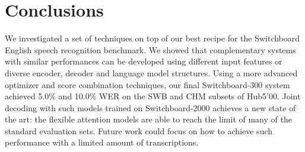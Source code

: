 \documentclass[a4paper]{article}
\begin{document}
\section{Conclusions}
\vspace{-.5mm}
\label{sec:conc}
\renewcommand{\baselinestretch}{0.946}\normalsize
We investigated a set of techniques on top of our best recipe for the Switchboard English speech recognition benchmark.
We showed that complementary systems with similar performances can be developed using different input features or diverse encoder, decoder and language model structures.
Using a more advanced optimizer and score combination techniques, our final Switchboard-300 system achieved 5.0\% and 10.0\% WER on the SWB and CHM subsets of Hub5'00.
Joint decoding with such models trained on Switchboard-2000 achieves a new state of the art: the flexible attention models are able to reach the limit of many of the standard evaluation sets.
Future work could focus on how to achieve such performance with a limited amount of transcriptions.

\newpage
\ninept


\end{document}
